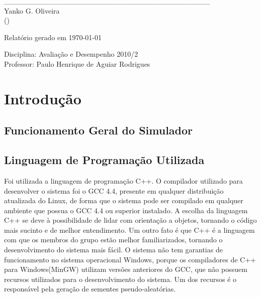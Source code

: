 \documentclass[a4paper,10pt]{article}
\begin{document}
\begin{titlepage}
\begin{center}
\_\_\_\_\_\_\_\_\_\_\_\_\_\_\_\_\_\_\_\_\_\_\_\_\_\_\_\_\_\_\_\_\_\_\_\_\_\_\_\\
Yanko G. Oliveira\\()\\

\vspace{0.5cm}

\vspace{1cm}

Relatório gerado em \today

\normalsize
\end{center}

\vfill

\begin{flushright}
Disciplina: Avaliação e Desempenho 2010/2\\
Professor: Paulo Henrique de Aguiar Rodrigues\\
\end{flushright}

\vspace{2cm}

\end{titlepage}

\pagebreak

\tableofcontents
\pagebreak

\section{Introdução}
\subsection{Funcionamento Geral do Simulador}
\subsection{Linguagem de Programação Utilizada}
    Foi utilizada a linguagem de programação C++. O compilador utilizado para desenvolver o sistema foi o GCC 4.4, presente em qualquer distribuição atualizada do Linux, de forma que o sistema pode ser compilado em qualquer ambiente que possua o GCC 4.4 ou superior instalado.\linebreak
    A escolha da linguagem C++ se deve à possibilidade de lidar com orientação a objetos, tornando o código mais sucinto e de melhor entendimento. Um outro fato é que C++ é a linguagem com que os membros do grupo estão melhor familiarizados, tornando o desenvolvimento do sistema mais fácil.\linebreak
    O sistema não tem garantias de funcionamento no sistema operacional Windows, porque os compiladores de C++ para Windows(MinGW) utilizam versões anteriores do GCC, que não possuem recursos utilizados para o desenvolvimento do sistema. Um dos recursos é o responsável pela geração de sementes pseudo-aleatórias.\linebreak
\end{document}

